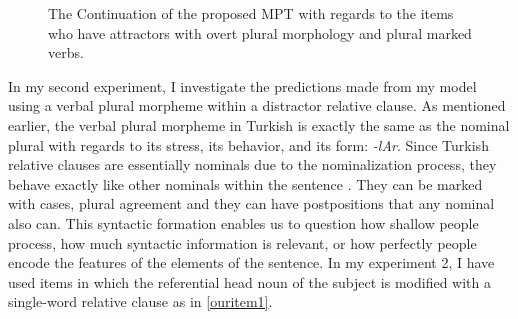 \documentclass[doc]{apa6}
\begin{document}
\begin{figure}[htb!]
\centering
{}
\caption{The Continuation of the proposed MPT with regards to the items who have attractors with overt plural morphology and  plural marked verbs.}
\label{model3}
\end{figure}

In my second experiment, I investigate the predictions made from my model using a verbal plural morpheme within a distractor relative clause. As mentioned earlier, the verbal plural morpheme in Turkish is exactly the same as the nominal plural with regards to its stress, its behavior, and its form: \emph{-lAr}. Since Turkish relative clauses are essentially nominals due to the nominalization process, they behave exactly like other nominals within the sentence \autocites{Goksel2004}{Taylan2015}. They can be marked with cases, plural agreement and they can have postpositions that any nominal also can. This syntactic formation enables us to question how shallow people process, how much syntactic information is relevant, or how perfectly people encode the features of the elements of the sentence. In my experiment 2, I have used items in which the referential head noun of the subject is modified with a single-word relative clause as in \autoref{ouritem1}.
\end{document}
